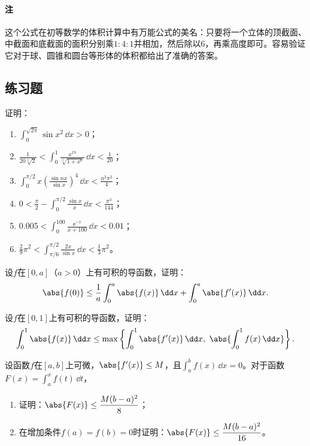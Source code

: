 \paragraph{注} 这个公式在初等数学的体积计算中有万能公式的美名：只要将一个立体的顶截面、中截面和底截面的面积分别乘$1:4:1$并相加，然后除以6，再乘高度即可。容易验证它对于球、圆锥和圆台等形体的体积都给出了准确的答案。

\subsection{练习题}

\begin{xexercise}[1]
证明：
  \begin{enumerate}[label=(\arabic*)]
    \item $\displaystyle \int_0^{\sqrt{2\pi}}\sin x^2\,\dd x>0$；
    \item $\displaystyle \frac1{20\sqrt[3]{2}}<\int_0^1\frac{x^{19}}{\sqrt[3]{1+x^6}}\,\dd x<\frac1{20}$；
    \item $\displaystyle \int_0^{\pi/2}x\left(\frac{\sin nx}{\sin x}\right)^4\,\dd x<\frac{n^2\pi^2}{4}$；
    \item $\displaystyle 0<\frac\pi2-\int_0^{\pi/2}\frac{\sin x}{x}\,\dd x<\frac{\pi^3}{144}$；
    \item $\displaystyle 0.005<\int_0^{100}\frac{\ee^{-x}}{x+100}\,\dd x<0.01$；
    \item $\displaystyle \frac29\pi^2<\int_{\pi/6}^{\pi/2}\frac{2x}{\sin x}\,\dd x<\frac13\pi^2$。
  \end{enumerate}
\end{xexercise}

\begin{xexercise}[2]
设$f$在$[0,a]$（$a>0$）上有可积的导函数，证明：
  \[
    \abs{f(0)}\le\frac1a\int_0^a\abs{f(x)}\,\dd x+\int_0^a\abs{f'(x)}\,\dd x.
  \]
\end{xexercise}

\begin{xexercise}[3]
设$f$在$[0,1]$上有可积的导函数，证明：
  \[
    \int_0^1\abs{f(x)}\,\dd x\le\max\left\{\int_0^1\abs{f'(x)}\,\dd x,\ \abs{\int_0^1f(x)\,\dd x}\right\}.
  \]
\end{xexercise}

\begin{xexercise}[4]
设函数$f$在$[a,b]$上可微，$\abs{f'(x)}\le M$，且$\int_a^bf(x)\,\dd x=0$。对于函数$F(x)=\int_a^xf(t)\,\dd t$，
  \begin{enumerate}[label=(\arabic*)]
    \item 证明：$\abs{F(x)}\le\dfrac{M(b-a)^2}{8}$；
    \item 在增加条件$f(a)=f(b)=0$时证明：$\abs{F(x)}\le\dfrac{M(b-a)^2}{16}$。
  \end{enumerate}
\end{xexercise}

